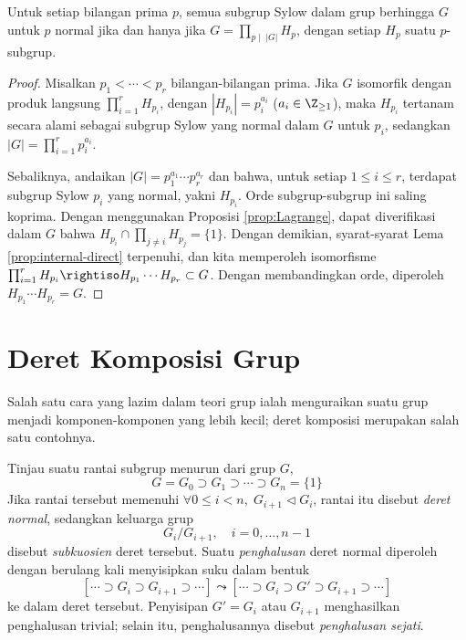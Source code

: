 \begin{proposition}
	Untuk setiap bilangan prima $p$, semua subgrup Sylow dalam grup berhingga $G$ untuk $p$ normal jika dan hanya jika $G = \prod_{p \mid\; |G|} H_p$, dengan setiap $H_p$ suatu $p$-subgrup.
\end{proposition}
\begin{proof}
	Misalkan $p_1 < \cdots < p_r$ bilangan-bilangan prima. Jika $G$ isomorfik dengan produk langsung $\prod_{i=1}^r H_{p_i}$, dengan $|H_{p_i}| = p_i^{a_i}$ ($a_i \in \Z_{\geq 1}$), maka $H_{p_i}$ tertanam secara alami sebagai subgrup Sylow yang normal dalam $G$ untuk $p_i$, sedangkan $|G| = \prod_{i=1}^r p_i^{a_i}$.

	Sebaliknya, andaikan $|G| = p_1^{a_1} \cdots p_r^{a_r}$ dan bahwa, untuk setiap $1 \leq i \leq r$, terdapat subgrup Sylow $p_i$ yang normal, yakni $H_{p_i}$. Orde subgrup-subgrup ini saling koprima. Dengan menggunakan Proposisi \ref{prop:Lagrange}, dapat diverifikasi dalam $G$ bahwa $H_{p_i} \cap \prod_{j \neq i} H_{p_j} = \{1\}$. Dengan demikian, syarat-syarat Lema \ref{prop:internal-direct} terpenuhi, dan kita memperoleh isomorfisme $\prod_{i=1}^r H_{p_i} \rightiso H_{p_1} \cdots H_{p_r} \subset G$. Dengan membandingkan orde, diperoleh $H_{p_1} \cdots H_{p_r} = G$.
\end{proof}
\section{Deret Komposisi Grup}\label{sec:composition-series-grp}
Salah satu cara yang lazim dalam teori grup ialah menguraikan suatu grup menjadi komponen-komponen yang lebih kecil; deret komposisi merupakan salah satu contohnya.

\begin{definition}\label{def:normal-series}
	Tinjau suatu rantai subgrup menurun dari grup $G$,
	\[ G = G_0 \supset G_1 \supset \cdots \supset G_n = \{1\} \]
	Jika rantai tersebut memenuhi $\forall 0 \leq i < n,\;  G_{i+1} \lhd G_i$, rantai itu disebut \emph{deret normal}, sedangkan keluarga grup
	\[ G_i/G_{i+1}, \quad i=0, \ldots, n-1 \]
	disebut \emph{subkuosien} deret tersebut. Suatu \emph{penghalusan} deret normal diperoleh dengan berulang kali menyisipkan suku dalam bentuk 
	\[ \left[ \cdots \supset G_i \supset G_{i+1} \supset \cdots \right] \leadsto \left[ \cdots \supset G_i \supset G' \supset G_{i+1} \supset \cdots \right] \]
	ke dalam deret tersebut. Penyisipan $G' = G_i$ atau $G_{i+1}$ menghasilkan penghalusan trivial; selain itu, penghalusannya disebut \emph{penghalusan sejati}.
\end{definition}

